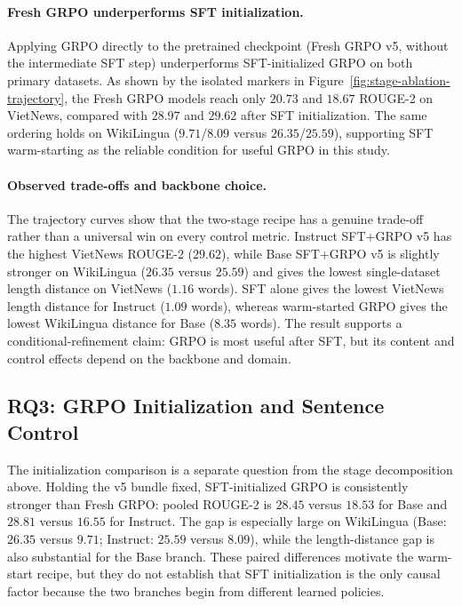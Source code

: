 \documentclass[11pt]{article}
\begin{document}
\paragraph{Fresh GRPO underperforms SFT initialization.}
Applying GRPO directly to the pretrained checkpoint (Fresh GRPO v5, without the intermediate SFT step) underperforms SFT-initialized GRPO on both primary datasets.
As shown by the isolated markers in Figure~\ref{fig:stage-ablation-trajectory}, the Fresh GRPO models reach only $20.73$ and $18.67$ ROUGE-2 on VietNews, compared with $28.97$ and $29.62$ after SFT initialization.
The same ordering holds on WikiLingua ($9.71$/$8.09$ versus $26.35$/$25.59$), supporting SFT warm-starting as the reliable condition for useful GRPO in this study.

\paragraph{Observed trade-offs and backbone choice.}
The trajectory curves show that the two-stage recipe has a genuine trade-off rather than a universal win on every control metric.
Instruct SFT+GRPO v5 has the highest VietNews ROUGE-2 ($29.62$), while Base SFT+GRPO v5 is slightly stronger on WikiLingua ($26.35$ versus $25.59$) and gives the lowest single-dataset length distance on VietNews ($1.16$ words).
SFT alone gives the lowest VietNews length distance for Instruct ($1.09$ words), whereas warm-started GRPO gives the lowest WikiLingua distance for Base ($8.35$ words).
The result supports a conditional-refinement claim: GRPO is most useful after SFT, but its content and control effects depend on the backbone and domain.

\subsection{RQ3: GRPO Initialization and Sentence Control}
The initialization comparison is a separate question from the stage decomposition above. Holding the v5 bundle fixed, SFT-initialized GRPO is consistently stronger than Fresh GRPO: pooled ROUGE-2 is $28.45$ versus $18.53$ for Base and $28.81$ versus $16.55$ for Instruct. The gap is especially large on WikiLingua (Base: $26.35$ versus $9.71$; Instruct: $25.59$ versus $8.09$), while the length-distance gap is also substantial for the Base branch. These paired differences motivate the warm-start recipe, but they do not establish that SFT initialization is the only causal factor because the two branches begin from different learned policies.
\end{document}
